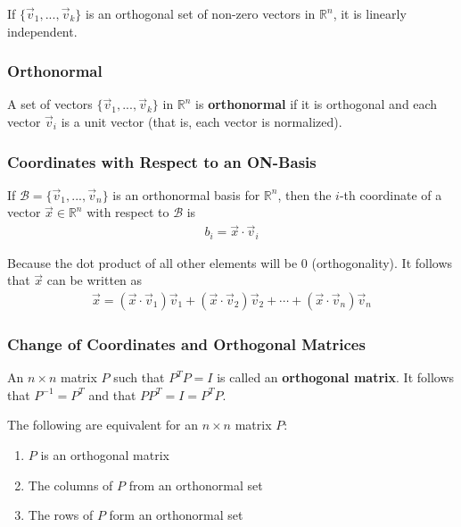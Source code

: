 \documentclass[a4paper,9pt]{extarticle}
\begin{document}
\begin{multicols*}{2}
If $\{\vec{v}_1, ..., \vec{v}_k\}$ is an orthogonal set of non-zero vectors in $\mathbb{R}^n$, it is linearly independent.


\subsubsection{Orthonormal}
A set of vectors $\{\vec{v}_1, ..., \vec{v}_k\}$ in $\mathbb{R}^n$ is \textbf{orthonormal} if it is orthogonal and each vector $\vec{v}_i$ is a unit vector (that is, each vector is normalized).


\subsubsection{Coordinates with Respect to an ON-Basis}
If $\mathcal{B} = \{\vec{v}_1, ..., \vec{v}_n\}$ is an orthonormal basis for $\mathbb{R}^n$, then the $i$-th coordinate of a vector $\vec{x} \in \mathbb{R}^n$ with respect to $\mathcal{B}$ is
\begin{equation} \label{7.1-1}
    \begin{split}
        b_i = \vec{x} \cdot \vec{v}_i
    \end{split}
\end{equation}

Because the dot product of all other elements will be 0 (orthogonality). It follows that $\vec{x}$ can be written as
\begin{equation} \label{7.1-2}
    \begin{split}
        \vec{x} = (\vec{x} \cdot \vec{v}_1) \vec{v}_1 + (\vec{x} \cdot \vec{v}_2) \vec{v}_2 + \cdots + (\vec{x} \cdot \vec{v}_n) \vec{v}_n 
    \end{split}
\end{equation}


\subsubsection{Change of Coordinates and Orthogonal Matrices}
An $n \times n$ matrix $P$ such that $P^T P = I$ is called an \textbf{orthogonal matrix}. It follows that $P^{-1} = P^T$ and that $P P^T = I = P^T P$.

The following are equivalent for an $n \times n$ matrix $P$:
\begin{enumerate}[label=\bfseries (\arabic*)] \itemsep0pt \parskip0pt 
    \item $P$ is an orthogonal matrix
    \item The columns of $P$ from an orthonormal set
    \item The rows of $P$ form an orthonormal set
\end{enumerate}


\end{multicols*}
\end{document}
